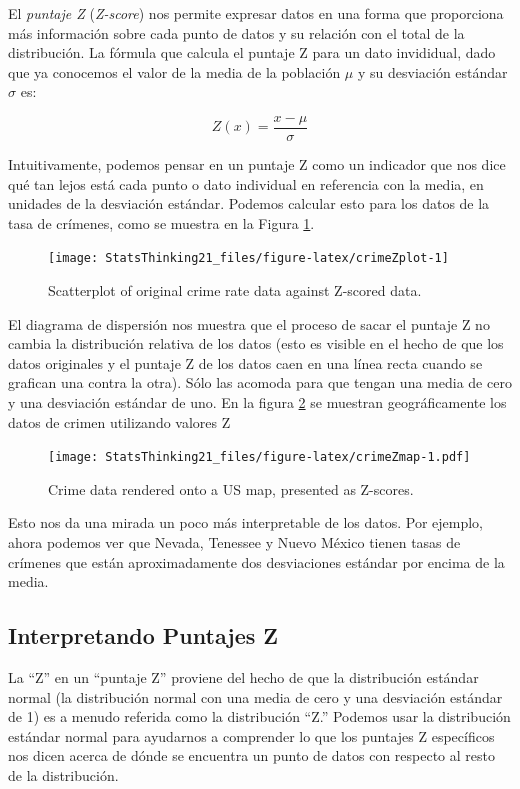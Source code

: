 \documentclass[
  12pt,
]{book}
\theoremstyle{definition}
\theoremstyle{definition}
\theoremstyle{definition}
\theoremstyle{remark}
\begin{document}
El \emph{puntaje Z} (\emph{Z-score}) nos permite expresar datos en una forma que proporciona más información sobre cada punto de datos y su relación con el total de la distribución. La fórmula que calcula el puntaje Z para un dato invididual, dado que ya conocemos el valor de la media de la población \(\mu\) y su desviación estándar \(\sigma\) es:

\[
Z(x) = \frac{x - \mu}{\sigma}
\]

Intuitivamente, podemos pensar en un puntaje Z como un indicador que nos dice qué tan lejos está cada punto o dato individual en referencia con la media, en unidades de la desviación estándar. Podemos calcular esto para los datos de la tasa de crímenes, como se muestra en la Figura \ref{fig:crimeZplot}.

\begin{figure}
\texttt{[image: StatsThinking21\_files/figure-latex/crimeZplot-1]} \caption{Scatterplot of original crime rate data against Z-scored data.}\label{fig:crimeZplot}
\end{figure}

El diagrama de dispersión nos muestra que el proceso de sacar el puntaje Z no cambia la distribución relativa de los datos (esto es visible en el hecho de que los datos originales y el puntaje Z de los datos caen en una línea recta cuando se grafican una contra la otra).
Sólo las acomoda para que tengan una media de cero y una desviación estándar de uno. En la figura \ref{fig:crimeZmap} se muestran geográficamente los datos de crimen utilizando valores Z

\begin{figure}
\centering
\texttt{[image: StatsThinking21\_files/figure-latex/crimeZmap-1.pdf]}
\caption{\label{fig:crimeZmap}Crime data rendered onto a US map, presented as Z-scores.}
\end{figure}

Esto nos da una mirada un poco más interpretable de los datos. Por ejemplo, ahora podemos ver que Nevada, Tenessee y Nuevo México tienen tasas de crímenes que están aproximadamente dos desviaciones estándar por encima de la media.

\hypertarget{interpretando-puntajes-z}{%
\subsection{Interpretando Puntajes Z}\label{interpretando-puntajes-z}}

La ``Z'' en un ``puntaje Z'' proviene del hecho de que la distribución estándar normal (la distribución normal con una media de cero y una desviación estándar de 1) es a menudo referida como la distribución ``Z.'' Podemos usar la distribución estándar normal para ayudarnos a comprender lo que los puntajes Z específicos nos dicen acerca de dónde se encuentra un punto de datos con respecto al resto de la distribución.
\end{document}
